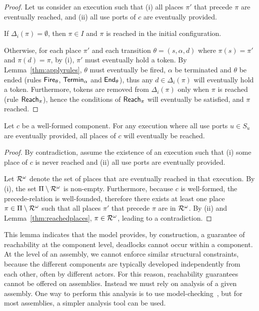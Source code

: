 {{  \begin{proof}
    Let us consider an execution such that (i) all places $\pi'$ that
    precede $\pi$ are eventually reached, and (ii) all use ports of
    $c$ are eventually provided.

    If $\Delta_i(\pi) = \emptyset$, then $\pi \in I$ and $\pi$ is
    reached in the initial configuration.
    
    Otherwise, for each place $\pi'$ and each transition $\theta = (s,
    \alpha, d)$ where $\pi(s) = \pi'$ and $\pi(d) = \pi$, by (i),
    $\pi'$ must eventually hold a token. By
    Lemma~\ref{thm:applyrules}, $\theta$ must eventually be fired,
    $\alpha$ be terminated and $\theta$ be ended (rules $\mathsf{Fire}_\theta$,
    $\mathsf{Termin}_\alpha$ and $\mathsf{End}_\theta$), thus any $d \in \Delta_i(\pi)$
    will eventually hold a token. Furthermore, tokens are removed from
    $\Delta_i(\pi)$ only when $\pi$ is reached (rule $\mathsf{Reach}_\pi$),
    hence the conditions of $\mathsf{Reach}_\pi$ will eventually be
    satisfied, and $\pi$ reached.
  \end{proof}
  
  \begin{lemma}
    Let $c$ be a well-formed component. For any execution where all
    use ports $u \in S_u$ are eventually provided, all places of $c$
    will eventually be reached.
  \end{lemma}

  \begin{proof}
    By contradiction, assume the existence of an execution such that
    (i) some place of $c$ is never reached and (ii) all use ports are
    eventually provided.

    Let $\mathcal{R}^\omega$ denote the set of places that are eventually
    reached in that execution. By (i), the set $\Pi \setminus
    \mathcal{R}^\omega$ is non-empty. Furthermore, because $c$ is
    well-formed, the precede-relation is well-founded, therefore there
    exists at least one place $\pi \in \Pi \setminus \mathcal{R}^\omega$
    such that all places $\pi'$ that precede $\pi$ are in
    $\mathcal{R}^\omega$. By (ii) and Lemma~\ref{thm:reachedplaces}, $\pi
    \in \mathcal{R}^\omega$, leading to a contradiction.
  \end{proof}

  This lemma indicates that the \mad model provides, by construction,
  a guarantee of reachability at the component level, \ie deadlocks
  cannot occur within a component. At the level of an assembly, we
  cannot enforce similar structural constraints, because the different
  components are typically developed independently from each other,
  often by different actors. For this reason, reachability guarantees
  cannot be offered on assemblies. Instead we must rely on analysis of
  a given assembly. One way to perform this analysis is to use
  model-checking~\cite{coullon:hal-02323641}, but for most assemblies,
  a simpler analysis tool can be used.
}

}
